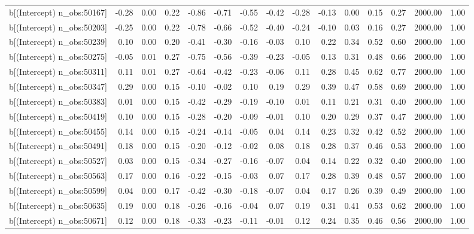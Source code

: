 \begin{table}[ht]
\begin{tabular}{rrrrrrrrrrrrrrr}
  b[(Intercept) n\_obs:50167] & -0.28 & 0.00 & 0.22 & -0.86 & -0.71 & -0.55 & -0.42 & -0.28 & -0.13 & 0.00 & 0.15 & 0.27 & 2000.00 & 1.00 \\ 
  b[(Intercept) n\_obs:50203] & -0.25 & 0.00 & 0.22 & -0.78 & -0.66 & -0.52 & -0.40 & -0.24 & -0.10 & 0.03 & 0.16 & 0.27 & 2000.00 & 1.00 \\ 
  b[(Intercept) n\_obs:50239] & 0.10 & 0.00 & 0.20 & -0.41 & -0.30 & -0.16 & -0.03 & 0.10 & 0.22 & 0.34 & 0.52 & 0.60 & 2000.00 & 1.00 \\ 
  b[(Intercept) n\_obs:50275] & -0.05 & 0.01 & 0.27 & -0.75 & -0.56 & -0.39 & -0.23 & -0.05 & 0.13 & 0.31 & 0.48 & 0.66 & 2000.00 & 1.00 \\ 
  b[(Intercept) n\_obs:50311] & 0.11 & 0.01 & 0.27 & -0.64 & -0.42 & -0.23 & -0.06 & 0.11 & 0.28 & 0.45 & 0.62 & 0.77 & 2000.00 & 1.00 \\ 
  b[(Intercept) n\_obs:50347] & 0.29 & 0.00 & 0.15 & -0.10 & -0.02 & 0.10 & 0.19 & 0.29 & 0.39 & 0.47 & 0.58 & 0.69 & 2000.00 & 1.00 \\ 
  b[(Intercept) n\_obs:50383] & 0.01 & 0.00 & 0.15 & -0.42 & -0.29 & -0.19 & -0.10 & 0.01 & 0.11 & 0.21 & 0.31 & 0.40 & 2000.00 & 1.00 \\ 
  b[(Intercept) n\_obs:50419] & 0.10 & 0.00 & 0.15 & -0.28 & -0.20 & -0.09 & -0.01 & 0.10 & 0.20 & 0.29 & 0.37 & 0.47 & 2000.00 & 1.00 \\ 
  b[(Intercept) n\_obs:50455] & 0.14 & 0.00 & 0.15 & -0.24 & -0.14 & -0.05 & 0.04 & 0.14 & 0.23 & 0.32 & 0.42 & 0.52 & 2000.00 & 1.00 \\ 
  b[(Intercept) n\_obs:50491] & 0.18 & 0.00 & 0.15 & -0.20 & -0.12 & -0.02 & 0.08 & 0.18 & 0.28 & 0.37 & 0.46 & 0.53 & 2000.00 & 1.00 \\ 
  b[(Intercept) n\_obs:50527] & 0.03 & 0.00 & 0.15 & -0.34 & -0.27 & -0.16 & -0.07 & 0.04 & 0.14 & 0.22 & 0.32 & 0.40 & 2000.00 & 1.00 \\ 
  b[(Intercept) n\_obs:50563] & 0.17 & 0.00 & 0.16 & -0.22 & -0.15 & -0.03 & 0.07 & 0.17 & 0.28 & 0.39 & 0.48 & 0.57 & 2000.00 & 1.00 \\ 
  b[(Intercept) n\_obs:50599] & 0.04 & 0.00 & 0.17 & -0.42 & -0.30 & -0.18 & -0.07 & 0.04 & 0.17 & 0.26 & 0.39 & 0.49 & 2000.00 & 1.00 \\ 
  b[(Intercept) n\_obs:50635] & 0.19 & 0.00 & 0.18 & -0.26 & -0.16 & -0.04 & 0.07 & 0.19 & 0.31 & 0.41 & 0.53 & 0.62 & 2000.00 & 1.00 \\ 
  b[(Intercept) n\_obs:50671] & 0.12 & 0.00 & 0.18 & -0.33 & -0.23 & -0.11 & -0.01 & 0.12 & 0.24 & 0.35 & 0.46 & 0.56 & 2000.00 & 1.00 \\ 

\end{tabular}
\end{table}

